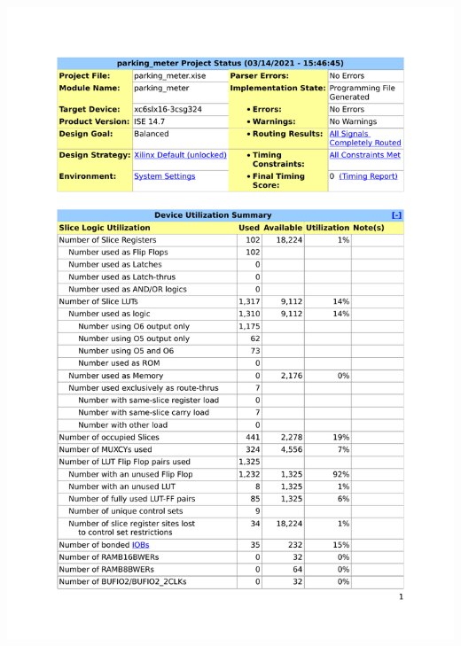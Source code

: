 \documentclass{article}
\begin{document}
{\centering\includegraphics[scale=0.8, page=3]{../figs/summary.pdf}\par}

\pagebreak
\end{document}
